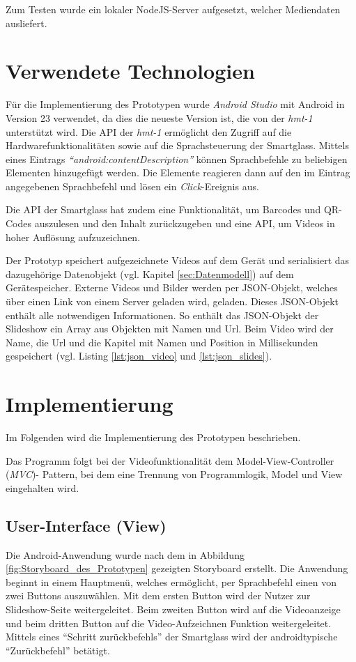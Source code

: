 Zum Testen wurde ein lokaler NodeJS-Server aufgesetzt, welcher Mediendaten ausliefert.
%
%
%
%
%
%
\section{Verwendete Technologien}
\label{sec:Verwendete_Technologien}
Für die Implementierung des Prototypen wurde \emph{Android Studio} mit Android in Version 23 verwendet, da dies die neueste Version ist, die von der \emph{hmt-1} unterstützt wird. Die API der \emph{hmt-1} ermöglicht den Zugriff auf die Hardwarefunktionalitäten sowie auf die Sprachsteuerung der Smartglass. Mittels eines Eintrags \emph{\enquote{android:contentDescription}} können Sprachbefehle zu beliebigen Elementen hinzugefügt werden. Die Elemente reagieren dann auf den im Eintrag angegebenen Sprachbefehl und lösen ein \emph{Click}-Ereignis aus.

Die API der Smartglass hat zudem eine Funktionalität, um Barcodes und QR-Codes auszulesen und den Inhalt zurückzugeben und eine API, um Videos in hoher Auflösung aufzuzeichnen. 

Der Prototyp speichert aufgezeichnete Videos auf dem Gerät und serialisiert das dazugehörige Datenobjekt (vgl. Kapitel \ref{sec:Datenmodell}) auf dem Gerätespeicher. Externe Videos und Bilder werden per JSON-Objekt, welches über einen Link von einem Server geladen wird, geladen. Dieses JSON-Objekt enthält alle notwendigen Informationen. So enthält das JSON-Objekt der Slideshow ein Array aus Objekten mit Namen und Url. Beim Video wird der Name, die Url und die Kapitel mit Namen und Position in Millisekunden gespeichert (vgl. Listing \ref{lst:json_video} und \ref{lst:json_slides}).
%
%
%
%
%
%
\section{Implementierung}
\label{sec:Implementation}
Im Folgenden wird die Implementierung des Prototypen beschrieben. 

Das Programm folgt bei der Videofunktionalität dem Model-View-Controller (\emph{MVC})- Pattern, bei dem eine Trennung von Programmlogik, Model und View eingehalten wird.
%
%
%
%
%
%
\subsection{User-Interface (View)}
Die Android-Anwendung wurde nach dem in Abbildung \ref{fig:Storyboard_des_Prototypen} gezeigten Storyboard erstellt. Die Anwendung beginnt in einem Hauptmenü, welches ermöglicht, per Sprachbefehl einen von zwei Buttons auszuwählen. Mit dem ersten Button wird der Nutzer zur Slideshow-Seite weitergeleitet. Beim zweiten Button wird auf die Videoanzeige und beim dritten Button auf die Video-Aufzeichnen Funktion weitergeleitet. Mittels eines \enquote{Schritt zurückbefehls} der Smartglass wird der androidtypische \enquote{Zurückbefehl} betätigt.

